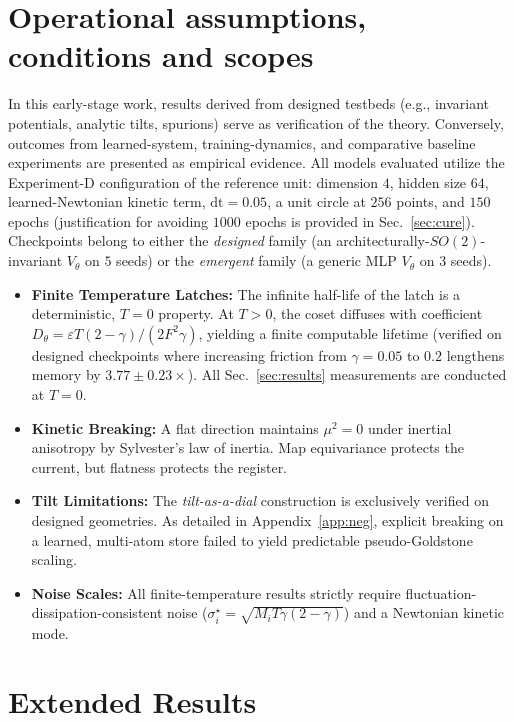 \documentclass[mlabstract,onecolumn]{jmlr}
\begin{document}
\section{Operational assumptions, conditions and scopes}
\label{app:opass}
In this early-stage work, results derived from designed testbeds (e.g., invariant potentials, analytic tilts, spurions) serve as verification of the theory. Conversely, outcomes from learned-system, training-dynamics, and comparative baseline experiments are presented as empirical evidence. All models evaluated utilize the Experiment-D configuration of the reference unit: dimension $4$, hidden size $64$, learned-Newtonian kinetic term, $\mathrm{dt}=0.05$, a unit circle at $256$ points, and $150$ epochs (justification for avoiding $1000$ epochs is provided in Sec.~\ref{sec:cure}). Checkpoints belong to either the \emph{designed} family (an architecturally-$SO(2)$-invariant $V_\theta$ on $5$ seeds) or the \emph{emergent} family (a generic MLP $V_\theta$ on $3$ seeds).
\begin{itemize}
    \item \textbf{Finite Temperature Latches:} The infinite half-life of the latch is a deterministic, $T=0$ property. At $T>0$, the coset diffuses with coefficient $D_\theta=\varepsilon T(2-\gamma)/(2F^2\gamma)$, yielding a finite computable lifetime (verified on designed checkpoints where increasing friction from $\gamma=0.05$ to $0.2$ lengthens memory by $3.77\pm0.23\times$). All Sec.~\ref{sec:results} measurements are conducted at $T=0$.
    \item \textbf{Kinetic Breaking:} A flat direction maintains $\mu^2=0$ under inertial anisotropy by Sylvester's law of inertia. Map equivariance protects the current, but flatness protects the register.
    \item \textbf{Tilt Limitations:} The \emph{tilt-as-a-dial} construction is exclusively verified on designed geometries. As detailed in Appendix~\ref{app:neg}, explicit breaking on a learned, multi-atom store failed to yield predictable pseudo-Goldstone scaling.
    \item \textbf{Noise Scales:} All finite-temperature results strictly require fluctuation-dissipation-consistent noise ($\sigma^\star_i=\sqrt{M_iT\gamma(2-\gamma)}$) and a Newtonian kinetic mode.
\end{itemize}

\section{Extended Results}
\label{app:resEx}
\end{document}
